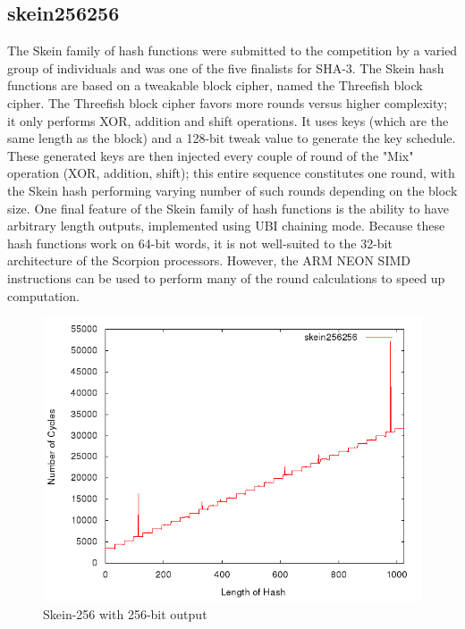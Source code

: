 \documentclass[10pt,a4paper]{article}
\begin{document}
\subsection{skein256256}
The Skein family of hash functions were submitted to the competition by a varied group of individuals and was one of the five finalists for SHA-3.  The Skein hash functions are based on a tweakable block cipher, named the Threefish block cipher.  The Threefish block cipher favors more rounds versus higher complexity; it only performs XOR, addition and shift operations.  It uses keys (which are the same length as the block) and a 128-bit tweak value to generate the key schedule.  These generated keys are then injected every couple of round of the "Mix" operation (XOR, addition, shift); this entire sequence constitutes one round, with the Skein hash performing varying number of such rounds depending on the block size.  One final feature of the Skein family of hash functions is the ability to have arbitrary length outputs, implemented using UBI chaining mode.  Because these hash functions work on 64-bit words, it is not well-suited to the 32-bit architecture of the Scorpion processors.  However, the ARM NEON SIMD instructions can be used to perform many of the round calculations to speed up computation.

    \begin{figure}[H]
        \begin{center}
            \includegraphics[scale=0.5]{images/skein256256.png} 
            \caption{Skein-256 with 256-bit output}
        \end{center}
    \end{figure}
\end{document}
